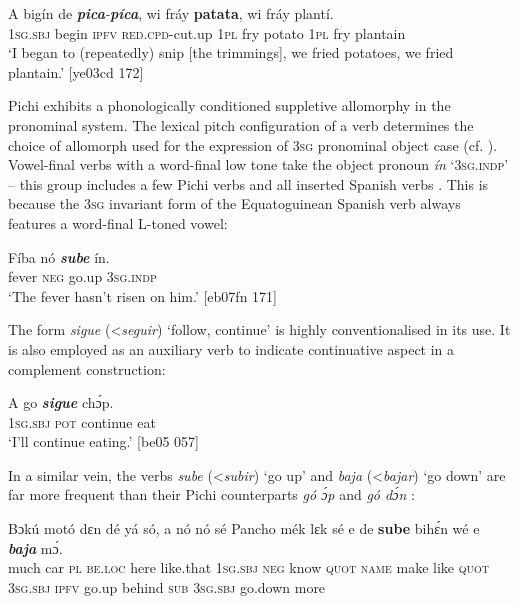 \ea%
    \label{ex:key:1712}
    \gll \MakeUppercase{A}   bigín  de  \textbf{\textit{pica}}\textit{{}-}\textbf{\textit{píca}},    wi  fráy  \textbf{patata},  wi  fráy  plantí.\\
\textsc{1sg.sbj}  begin  \textsc{ipfv}  \textsc{red.cpd-}cut.up  \textsc{1pl}  fry  potato  \textsc{1pl}  fry  plantain\\

\glt ‘I began to (repeatedly) snip [the trimmings], we fried potatoes, we fried
plantain.’ [ye03cd 172]
\z

Pichi exhibits a phonologically conditioned suppletive allomorphy in the pronominal system. The lexical pitch configuration of a verb determines the choice of allomorph used for the expression of \textsc{3sg} pronominal object case (cf. ). Vowel-final verbs with a word-final low tone take the object pronoun \textit{ín} ‘\textsc{3sg.indp}’ – this group includes a few Pichi verbs and all inserted Spanish verbs . This is because the \textsc{3sg} invariant form of the Equatoguinean Spanish verb always features a word-final L-toned vowel:


\ea%
    \label{ex:key:1713}
    \gll Fíba    nó  \textbf{\textit{sube}}    ín.\\
fever  \textsc{neg}  go.up  \textsc{3sg.indp}\\

\glt ‘The fever hasn’t risen on him.’ [eb07fn 171]
\z

The form \textit{sigue} (<\textit{seguir}) ‘follow, continue’ is highly conventionalised in its use. It is also employed as an auxiliary verb to indicate continuative aspect in a complement construction: 


\ea%
    \label{ex:key:1714}
    \gll \MakeUppercase{A}   go  \textbf{\textit{sigue}}    chɔ́p.\\
\textsc{1sg.sbj}  \textsc{pot}  continue    eat\\

\glt ‘I’ll continue eating.’ [be05 057]
\z

In a similar vein, the verbs \textit{sube} (<\textit{subir}) ‘go up’ and \textit{baja} (<\textit{bajar}) ‘go down’ are far more frequent than their Pichi counterparts\textit{ gó ɔ́p} and \textit{gó dɔ́n} : 


\ea%
    \label{ex:key:1715}
    \gll Bɔkú  motó  dɛn  dé    yá    só,    a    nó  nó    sé
Pancho  mék    lɛk  sé    e    de  \textbf{sube}    bihɛ́n
wé   e    \textbf{\textit{baja}}    mɔ́.\\
much  car    \textsc{pl}  \textsc{be.loc}  here    like.that  \textsc{1sg.sbj}  \textsc{neg}  know  \textsc{quot}
\textsc{name}  make  like  \textsc{quot}    \textsc{3sg.sbj}  \textsc{ipfv}  go.up  behind
\textsc{sub}  \textsc{3sg.sbj}  go.down  more\\

